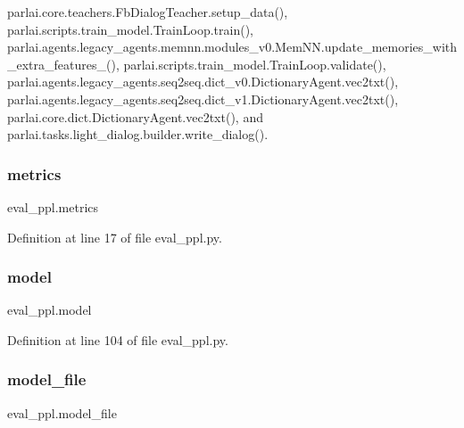 parlai.\+core.\+teachers.\+Fb\+Dialog\+Teacher.\+setup\+\_\+data(), parlai.\+scripts.\+train\+\_\+model.\+Train\+Loop.\+train(), parlai.\+agents.\+legacy\+\_\+agents.\+memnn.\+modules\+\_\+v0.\+Mem\+N\+N.\+update\+\_\+memories\+\_\+with\+\_\+extra\+\_\+features\+\_\+(), parlai.\+scripts.\+train\+\_\+model.\+Train\+Loop.\+validate(), parlai.\+agents.\+legacy\+\_\+agents.\+seq2seq.\+dict\+\_\+v0.\+Dictionary\+Agent.\+vec2txt(), parlai.\+agents.\+legacy\+\_\+agents.\+seq2seq.\+dict\+\_\+v1.\+Dictionary\+Agent.\+vec2txt(), parlai.\+core.\+dict.\+Dictionary\+Agent.\+vec2txt(), and parlai.\+tasks.\+light\+\_\+dialog.\+builder.\+write\+\_\+dialog().

\mbox{\label{namespaceeval__ppl_a30f7696b55125e4e64f1d3e97f6abc15}} 
\subsubsection{\texorpdfstring{metrics}{metrics}}
{\footnotesize\ttfamily eval\+\_\+ppl.\+metrics}



Definition at line 17 of file eval\+\_\+ppl.\+py.

\mbox{\label{namespaceeval__ppl_a4d13942cad0e4fdaa614c4f31de6e865}} 
\subsubsection{\texorpdfstring{model}{model}}
{\footnotesize\ttfamily eval\+\_\+ppl.\+model}



Definition at line 104 of file eval\+\_\+ppl.\+py.

\mbox{\label{namespaceeval__ppl_a91d80ebbef0aae52bb7aab3428c8b917}} 
\subsubsection{\texorpdfstring{model\+\_\+file}{model\_file}}
{\footnotesize\ttfamily eval\+\_\+ppl.\+model\+\_\+file}



